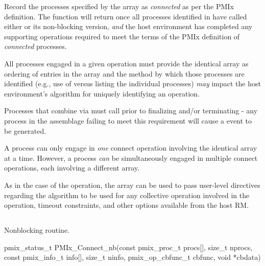 \descr

Record the processes specified by the  array as \textit{connected} as per the \ac{PMIx} definition. The function will return once all processes identified in  have called either  or its non-blocking version, \textit{and} the host environment has completed any supporting operations required to meet the terms of the \ac{PMIx} definition of \textit{connected} processes.

\adviceuserstart
All processes engaged in a given  operation must provide the identical  array as ordering of entries in the array and the method by which those processes are identified (e.g., use of  versus listing the individual processes) \textit{may} impact the host environment's algorithm for uniquely identifying an operation.
\adviceuserend

Processes that combine via  must call  prior to finalizing and/or terminating - any process in the assemblage failing to meet this requirement will cause a  event to be generated.

A process can only engage in \emph{one} connect operation involving the identical  array at a time.
However, a process \emph{can} be simultaneously engaged in multiple connect operations, each involving a different  array.

As in the case of the  operation, the  array can be used to pass user-level directives regarding the algorithm to be used for any collective operation involved in the operation, timeout constraints, and other options available from the host \ac{RM}.


\subsection{}

\summary

Nonblocking  routine.

\format

\cspecificstart
\begin{codepar}
pmix_status_t
PMIx_Connect_nb(const pmix_proc_t procs[], size_t nprocs,
                const pmix_info_t info[], size_t ninfo,
                pmix_op_cbfunc_t cbfunc, void *cbdata)
\end{codepar}
\cspecificend

